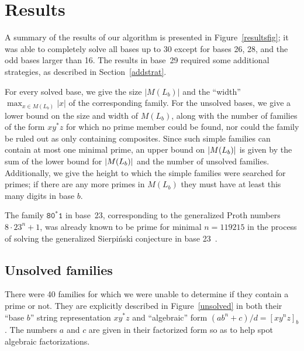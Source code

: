 \documentclass[12pt]{article}
\DeclarePairedDelimiter\abs{\lvert}{\rvert}
\theoremstyle{plain}
\theoremstyle{definition}
\newcommand{\0}{\mathtt{0}}
\newcommand{\1}{\mathtt{1}}
\newcommand{\2}{\mathtt{2}}
\newcommand{\3}{\mathtt{3}}
\newcommand{\4}{\mathtt{4}}
\newcommand{\5}{\mathtt{5}}
\newcommand{\6}{\mathtt{6}}
\newcommand{\7}{\mathtt{7}}
\newcommand{\8}{\mathtt{8}}
\newcommand{\9}{\mathtt{9}}
\begin{document}
\section{Results}
A summary of the results of our algorithm is presented in 
Figure~\ref{resultsfig}; it was able to completely solve all bases up to 30 except for
bases 26, 28, and the odd bases larger than 16.
The results in base~29 required some additional strategies, as described in Section~\ref{addstrat}.

For every solved base, we give the size $|M(L_b)|$ and the ``width'' $\max_{x \in M(L_b)} |x|$ of
the corresponding family.
For the unsolved bases, we give a lower bound on the size and width of $M(L_b)$,
along with the number of families of the form
$xy^*z$ for which no prime member could be found, nor could the family be
ruled out as only containing composites.  Since such simple families can contain at
most one minimal prime, an upper bound on $\abs{M(L_b)}$ is given by the
sum of the lower bound for $\abs{M(L_b)}$ and the number of unsolved families.
Additionally, we give the height to which the simple families were searched
for primes; if there are any more primes in $M(L_b)$ they must have at least
this many digits in base $b$.

The family $\8\0^*\1$ in base~23, corresponding to the
generalized Proth numbers $8\cdot23^n+1$, was already known to be prime
for minimal $n=119215$ in the process
of solving the generalized Sierpi\'nski conjecture in base 23~\cite{crus}.

\subsection{Unsolved families}
There were 40 families for which we were unable to determine if they contain a prime or not.
They are explicitly described in Figure~\ref{unsolved} in both their ``base $b$'' string representation
$xy^*z$ and ``algebraic'' form $(ab^n+c)/d=[xy^nz]_b$.  The numbers $a$ and $c$ are given in their factorized form
so as to help spot algebraic factorizations.
\end{document}
